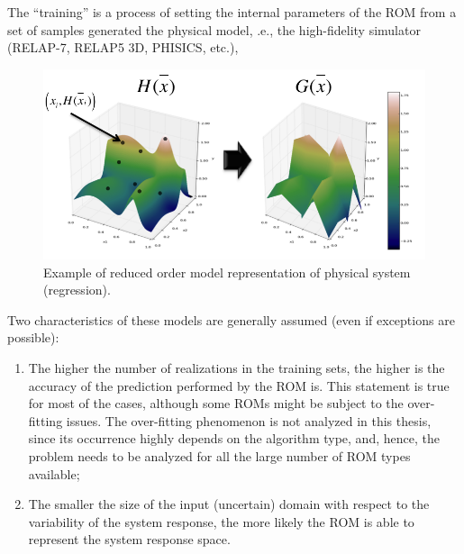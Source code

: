 The ``training'' is a process of setting the internal parameters of the ROM from a set
of samples generated the physical model, .e.,
 the high-fidelity simulator (RELAP-7, RELAP5
3D, PHISICS, etc.),
\begin{figure}[h!]
  \centering
  \includegraphics[width=1.0\textwidth]  {pics/ROMexampleOfPhysicalSystem.png}
  \caption{Example of reduced order model representation of physical system (regression).}
  \label{fig:ROMexampleOfPhysicalSystem}
\end{figure}

Two characteristics of these models
are generally assumed (even if exceptions are possible):
\begin{enumerate}
  \item The higher the number of realizations in the training sets, the
higher is the accuracy of the prediction performed by the ROM is. This
statement is true for most of the cases, although some ROMs might be
subject to the over-fitting issues. The over-fitting phenomenon is not
analyzed in this thesis, since its occurrence highly depends on the
algorithm type, and, hence, the problem needs to be analyzed for all
the large number of ROM types available;
  \item The smaller the size of the input (uncertain) domain with
  respect to the variability of the system response, the more likely the
  ROM is able to represent the system response space.
\end{enumerate}

